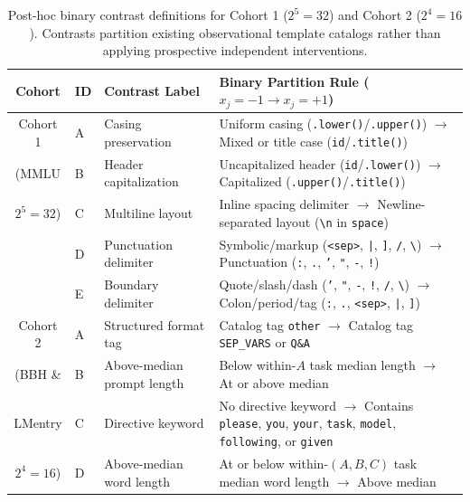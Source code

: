 \documentclass[11pt,a4paper]{article}
\begin{document}
\begin{table}[!ht]
\centering
\small
\setlength{\tabcolsep}{4.5pt}
\caption{Post-hoc binary contrast definitions for Cohort 1 ($2^5=32$) and Cohort 2 ($2^4=16$). Contrasts partition existing observational template catalogs rather than applying prospective independent interventions.}
\label{tab:factors_def}
\begin{tabularx}{\textwidth}{cll>{\raggedright\arraybackslash}X}
\toprule
\textbf{Cohort} & \textbf{ID} & \textbf{Contrast Label} & \textbf{Binary Partition Rule ($x_j = -1 \to x_j = +1$)} \\
\midrule
Cohort 1 & A & Casing preservation & Uniform casing (\texttt{.lower()}/\texttt{.upper()}) $\to$ Mixed or title case (\texttt{id}/\texttt{.title()}) \\
(MMLU & B & Header capitalization & Uncapitalized header (\texttt{id}/\texttt{.lower()}) $\to$ Capitalized (\texttt{.upper()}/\texttt{.title()}) \\
$2^5=32$) & C & Multiline layout & Inline spacing delimiter $\to$ Newline-separated layout (\texttt{\textbackslash n} in \texttt{space}) \\
 & D & Punctuation delimiter & Symbolic/markup (\texttt{<sep>}, \texttt{|}, \texttt{]}, \texttt{/}, \texttt{\textbackslash}) $\to$ Punctuation (\texttt{:}, \texttt{.}, \texttt{'}, \texttt{"}, \texttt{-}, \texttt{!}) \\
 & E & Boundary delimiter & Quote/slash/dash (\texttt{'}, \texttt{"}, \texttt{-}, \texttt{!}, \texttt{/}, \texttt{\textbackslash}) $\to$ Colon/period/tag (\texttt{:}, \texttt{.}, \texttt{<sep>}, \texttt{|}, \texttt{]}) \\
\midrule
Cohort 2 & A & Structured format tag & Catalog tag \texttt{other} $\to$ Catalog tag \texttt{SEP\_VARS} or \texttt{Q\&A} \\
(BBH \& & B & Above-median prompt length & Below within-$A$ task median length $\to$ At or above median \\
LMentry & C & Directive keyword & No directive keyword $\to$ Contains \texttt{please}, \texttt{you}, \texttt{your}, \texttt{task}, \texttt{model}, \texttt{following}, or \texttt{given} \\
$2^4=16$) & D & Above-median word length & At or below within-$(A,B,C)$ task median word length $\to$ Above median \\
\bottomrule
\end{tabularx}
\end{table}
\end{document}
